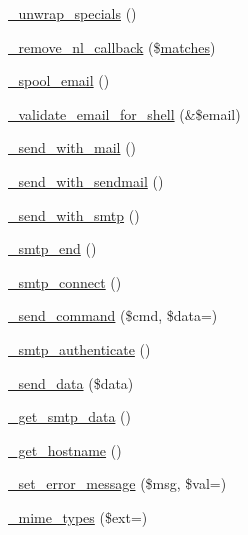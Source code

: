 \begin{DoxyCompactItemize}
\item 
\mbox{\hyperlink{class_c_i___email_af50bcab235f0eff47d7117d77733f1d9}{\+\_\+unwrap\+\_\+specials}} ()
\item 
\mbox{\hyperlink{class_c_i___email_a3a624f07cca99fe6ab1b61dbec56eef8}{\+\_\+remove\+\_\+nl\+\_\+callback}} (\$\mbox{\hyperlink{_functions_8php_a8968a55c84671473daa2233e6cae65b8}{matches}})
\item 
\mbox{\hyperlink{class_c_i___email_a5d45a2f98c27332dfe78086c88eafd3c}{\+\_\+spool\+\_\+email}} ()
\item 
\mbox{\hyperlink{class_c_i___email_a468f4ab8b122318d39baffe9e727d2be}{\+\_\+validate\+\_\+email\+\_\+for\+\_\+shell}} (\&\$email)
\item 
\mbox{\hyperlink{class_c_i___email_ae7e626556c4d619a7214bee6056badd4}{\+\_\+send\+\_\+with\+\_\+mail}} ()
\item 
\mbox{\hyperlink{class_c_i___email_a22ce9dc271da86e2a25041aa70e02502}{\+\_\+send\+\_\+with\+\_\+sendmail}} ()
\item 
\mbox{\hyperlink{class_c_i___email_a691e57a39f6f8956c5054fd7b109bb12}{\+\_\+send\+\_\+with\+\_\+smtp}} ()
\item 
\mbox{\hyperlink{class_c_i___email_a275593e37ea7d04035b5ce80d8934a13}{\+\_\+smtp\+\_\+end}} ()
\item 
\mbox{\hyperlink{class_c_i___email_ae57fde4883dcd1dec9f8999efef13f06}{\+\_\+smtp\+\_\+connect}} ()
\item 
\mbox{\hyperlink{class_c_i___email_a5431c3309ee720b3d1cc55c892359371}{\+\_\+send\+\_\+command}} (\$cmd, \$data=\textquotesingle{}\textquotesingle{})
\item 
\mbox{\hyperlink{class_c_i___email_a708494a94d2083993ede37cf65a0c0fa}{\+\_\+smtp\+\_\+authenticate}} ()
\item 
\mbox{\hyperlink{class_c_i___email_a42fa768e8678b3c1462762b9b812a302}{\+\_\+send\+\_\+data}} (\$data)
\item 
\mbox{\hyperlink{class_c_i___email_ac421324c92e681315a1f2d0d7fa96a5b}{\+\_\+get\+\_\+smtp\+\_\+data}} ()
\item 
\mbox{\hyperlink{class_c_i___email_ad2d333b7bb9f6c25400714dd8931fe11}{\+\_\+get\+\_\+hostname}} ()
\item 
\mbox{\hyperlink{class_c_i___email_a5f00196f0653becd7f5a7a590eaf0085}{\+\_\+set\+\_\+error\+\_\+message}} (\$msg, \$val=\textquotesingle{}\textquotesingle{})
\item 
\mbox{\hyperlink{class_c_i___email_a7581ef570bb25b483e80ee996c42e454}{\+\_\+mime\+\_\+types}} (\$ext=\textquotesingle{}\textquotesingle{})
\end{DoxyCompactItemize}
